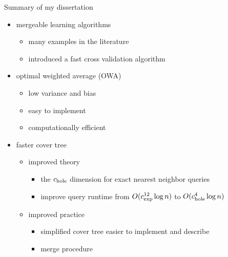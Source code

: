 \begin{frame}{Summary of my dissertation}

\begin{itemize}
\item mergeable learning algorithms 
\begin{itemize}
    \item many examples in the literature
\item introduced a fast cross validation algorithm
\end{itemize}

\vspace{0.1in}
\item optimal weighted average (OWA)
\begin{itemize}
\item low variance and bias
\item easy to implement
\item computationally efficient
\end{itemize}

\vspace{0.1in}
\item faster cover tree
\begin{itemize}
\item improved theory
\begin{itemize}
\item the $c_\textnormal{hole}$ dimension for exact nearest neighbor queries
\item improve query runtime from $O(c_\textnormal{exp}^{12}\log n)$ to $O(c_\textnormal{hole}^4\log n)$
\end{itemize}
\item improved practice
\begin{itemize}
\item simplified cover tree easier to implement and describe
\item merge procedure
\end{itemize}
\end{itemize}
\end{itemize}

\end{frame}
